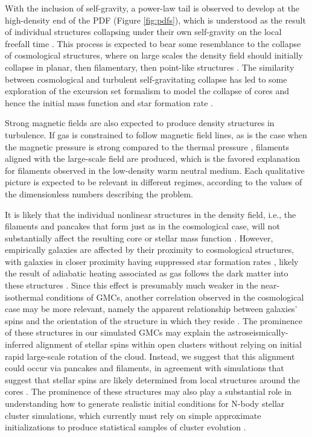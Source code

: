 \documentclass[twocolumn]{aastex63}
\begin{document}
With the inclusion of self-gravity, a power-law tail is observed to develop at the high-density end of the PDF (Figure \ref{fig:pdfs}), which is understood as the result of individual structures collapsing under their own self-gravity on the local freefall time \citep[e.g.,][]{Ballesteros-Paredes_2011, Federrath_2013}. This process is expected to bear some resemblance to the collapse of cosmological structures, where on large scales the density field should initially collapse in planar, then filamentary, then point-like structures \cite{zeldovich_1970}. The similarity between cosmological and turbulent self-gravitating collapse has led to some exploration of the excursion set formalism \citep{press_1974} to model the collapse of cores and hence the initial mass function and star formation rate \citep[e.g.,][]{hennebelle_2008, hopkins_2012}.

Strong magnetic fields are also expected to produce density structures in turbulence. If gas is constrained to follow magnetic field lines, as is the case when the magnetic pressure is strong compared to the thermal pressure \citep{Beattie_2021}, filaments aligned with the large-scale field are produced, which is the favored explanation for filaments observed in the low-density warm neutral medium. Each qualitative picture is expected to be relevant in different regimes, according to the values of the dimensionless numbers describing the problem. 

It is likely that the individual nonlinear structures in the density field, i.e., the filaments and pancakes that form just as in the cosmological case, will not substantially affect the resulting core or stellar mass function \citep[e.g.,][]{hopkins_2013}. However, empirically galaxies are affected by their proximity to cosmological structures, with galaxies in closer proximity having suppressed star formation rates \citep[e.g.,][]{winkel_2021}, likely the result of adiabatic heating associated as gas follows the dark matter into these structures \citep{peng_2010}. Since this effect is presumably much weaker in the near-isothermal conditions of GMCs, another correlation observed in the cosmological case may be more relevant, namely the apparent relationship between galaxies' spins and the orientation of the structure in which they reside  \citep[e.g.,][]{an_2021}. The prominence of these structures in our simulated GMCs may explain the astroseismically-inferred alignment of stellar spins within open clusters \citep{corsaro_2017} without relying on initial rapid large-scale rotation of the cloud. Instead, we suggest that this alignment could occur via pancakes and filaments, in agreement with simulations that suggest that stellar spins are likely determined from local structures around the cores \citep[e.g.,][]{kuznetsova_2019}. The prominence of these structures may also play a substantial role in understanding how to generate realistic initial conditions for N-body stellar cluster simulations, which currently must rely on simple approximate initializations to produce statistical samples of cluster evolution  \citep[e.g.,][]{torniamenti_2021}.
\end{document}
